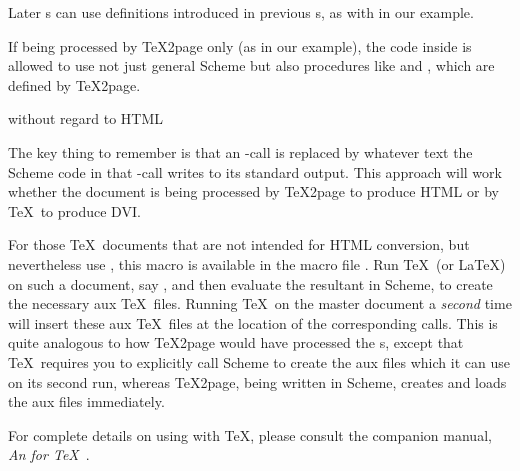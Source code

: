 {{{{{{{{{{{{{{{Later \p{\eval}s can
use definitions introduced in previous \p{\eval}s,
as with  in our example.

If being processed by \TeX2page only (as in our example),
the code inside \p{\eval} is allowed to use not just general Scheme
but also procedures like
 and , which are defined by
\TeX2page.

 without regard to HTML

%
The key thing to remember is that
an \p{\eval}-call is replaced by whatever text the
Scheme code in that \p{\eval}-call writes to its
standard output.  This approach will work whether the
document is being processed by \TeX2page to produce HTML
or by \TeX\ to produce DVI.

For those \TeX\ documents that are not intended for HTML conversion, but
nevertheless use \p{\eval}, this macro is available in the macro file
.  Run \TeX\ (or \LaTeX) on such a document, say
, and then evaluate
the resultant  in Scheme, to create the
necessary aux \TeX\ files.  Running \TeX\ on the master document a {\em second}
time will
insert these aux \TeX\ files at the location of the corresponding \p{\eval}
calls.  This is quite analogous to how \TeX2page would have processed the
\p{\eval}s, except that \TeX\ requires you to explicitly call Scheme to
create the aux files which it can use on its second run, whereas
\TeX2page, being written in Scheme, creates and loads the aux files
immediately.

For complete details on using \p{\eval} with
\TeX, please consult the companion manual,
{\em An \p{\eval} for
\TeX}~\cite{eval4tex}.


}}}}}}}}}}}}}}}
